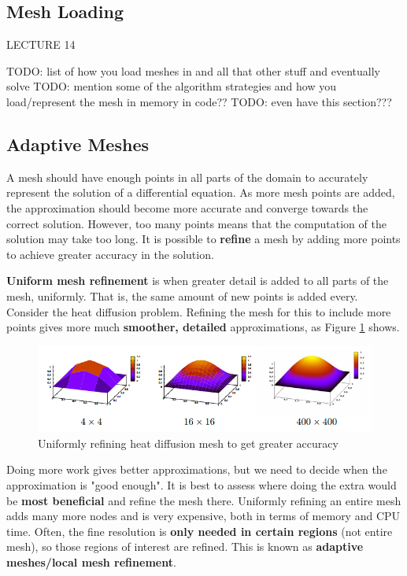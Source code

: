 \documentclass{article}
\begin{document}
\subsection{Mesh Loading}
\label{sec:mesh-loading}

LECTURE 14

TODO: list of how you load meshes in and all that other stuff and eventually solve
TODO: mention some of the algorithm strategies and how you load/represent the mesh in memory in code??
TODO: even have this section???

\subsection{Adaptive Meshes}
\label{sec:adaptive-meshes}

A mesh should have enough points in all parts of the domain to accurately represent the solution of a differential equation. As more mesh points are added, the approximation should become more accurate and converge towards the correct solution. However, too many points means that the computation of the solution may take too long. It is possible to \textbf{refine} a mesh by adding more points to achieve greater accuracy in the solution.

\textbf{Uniform mesh refinement} is when greater detail is added to all parts of the mesh, uniformly. That is, the same amount of new points is added every. Consider the heat diffusion problem. Refining the mesh for this to include more points gives more much \textbf{smoother, detailed} approximations, as Figure \ref{fig:uniform-refinement} shows.

\begin{figure}
	\centering
	\includegraphics[scale=0.6]{figures/uniform-refinement.png}
	\caption{Uniformly refining heat diffusion mesh to get greater accuracy}
	\label{fig:uniform-refinement}
\end{figure}

Doing more work gives better approximations, but we need to decide when the approximation is "good enough". It is best to assess where doing the extra would be \textbf{most beneficial} and refine the mesh there. Uniformly refining an entire mesh adds many more nodes and is very expensive, both in terms of memory and CPU time. Often, the fine resolution is \textbf{only needed in certain regions} (not entire mesh), so those regions of interest are refined. This is known as \textbf{adaptive meshes/local mesh refinement}.
 
\end{document}
